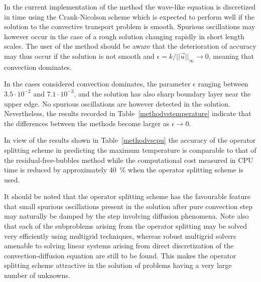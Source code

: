 In the current implementation of the method the 
wave-like equation is discretized in time
using the Crank-Nicolson scheme which is expected to perform well if 
the solution to the convective transport problem is smooth. Spurious
oscillations may however occur in the case of a rough solution changing 
rapidly in short length scales. The user of the method should be
aware that the deterioration of accuracy may thus occur if the solution is
not smooth and $\epsilon=k/||\vec u ||_\infty \longrightarrow 0$,
meaning that convection dominates.  
   
In the cases considered convection dominates, the parameter $\epsilon$ 
ranging between $3.5\cdot 10^{-2}$ and $7.1\cdot 10^{-3}$,
and the solution has also sharp boundary 
layer near the upper edge. No spurious oscillations are however detected in
the solution. Nevertheless, the results recorded in 
Table~\ref{methodvstemperature} indicate that the differences between the
methods become larger as $\epsilon \longrightarrow 0$. 
 
In view of the results shown in Table~\ref{methodvscpu} the accuracy of the 
operator splitting scheme in predicting the maximum temperature is comparable 
to that of the residual-free-bubbles method while the computational 
cost measured in CPU time is reduced by approximately 40~\% when 
the operator splitting scheme is used. 

It should be noted that the operator splitting scheme has 
the favourable feature that small spurious oscillations present in the 
solution after pure convection step may naturally be damped by the step 
involving diffusion phenomena. Note also that each of the subproblems arising 
from the operator splitting may be
solved very efficiently using multigrid techniques, whereas robust multigrid 
solvers amenable to solving linear systems arising from direct discretization 
of the convection-diffusion equation are still to be found. This makes 
the operator splitting scheme attractive in the solution of problems 
having a very large number of unknowns.   







